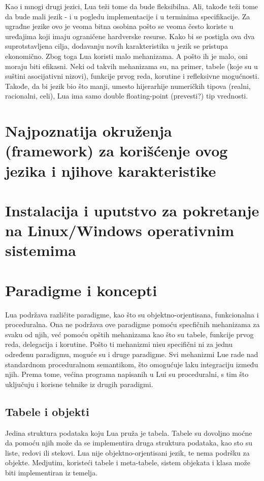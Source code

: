 \documentclass[a4paper]{article}
\begin{document}
Kao i mnogi drugi jezici, Lua teži tome da bude fleksibilna. Ali, takođe teži tome da bude mali jezik - i u pogledu implementacije i u terminima specifikacije. Za ugrađne jezike ovo je veoma bitna osobina pošto se veoma često koriste u uređajima koji imaju ograničene hardverske resurse. Kako bi se postigla ova dva suprotstavljena cilja, dodavanju novih karakteristika u jezik se pristupa ekonomično. Zbog toga Lua koristi malo mehanizama. A pošto ih je malo, oni moraju biti efikasni. Neki od takvih mehanizama su, na primer, tabele (koje su u suštini asocijativni nizovi), funkcije prvog reda, korutine i refleksivne mogućnosti. Takođe, da bi jezik bio što manji, umesto hijerarhije numeričkih tipova (realni, racionalni, celi), Lua ima samo double floating-point (prevesti?) tip vrednosti.\cite{multiParadigms}

\section{Najpoznatija okruženja (framework) za korišćenje ovog jezika i njihove karakteristike}
\label{sec:framework}


\section{Instalacija i uputstvo za pokretanje na Linux/Windows operativnim sistemima}
\label{sec:instalacija}


\section{Paradigme i koncepti}
\label{sec:paradigme_koncepti}

Lua podržava različite paradigme, kao što su objektno-orjentisana, funkcionalna i proceduralna. Ona ne podržava ove paradigme pomoću specfičnih mehanizama za svaku od njih, već pomoću opštih mehanizama kao što su tabele, funkcije prvog reda, delegacija i korutine. Pošto ti mehanizmi nisu specifični ni za jednu određenu paradigmu, moguće su i druge paradigme. Svi mehanizmi Lue rade nad standardnom proceduralnom semantikom, što omogućuje laku integraciju između njih. Prema tome, većina programa napisanih u Lui su proceduralni, s tim što uključuju i korisne tehnike iz drugih paradigmi. \cite{multiParadigms}

\subsection{Tabele i objekti}
Jedina struktura podataka koju Lua pruža je tabela. Tabele su dovoljno moćne da pomoću njih može da se implementira druga struktura podataka, kao sto su liste, redovi ili stekovi.
Lua nije objektno-orjentisani jezik, te nema podršku za objekte. Medjutim, koristeći tabele i meta-tabele, sistem objekata i klasa može biti implementiran iz temelja.
\end{document}
